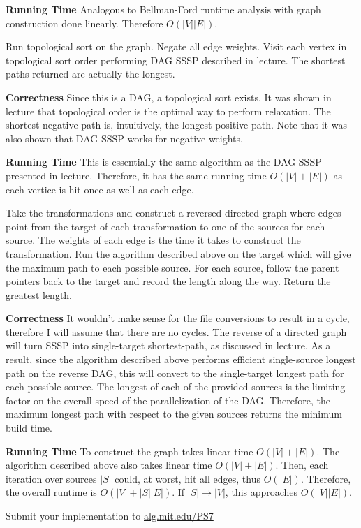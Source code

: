 \documentclass[12pt,twoside]{article}
\begin{document}
\begin{problems}
{\bf Running Time} Analogous to Bellman-Ford runtime analysis with graph
construction done linearly. Therefore $O(|V||E|)$.

\newpage

\problem

\begin{problemparts}

 Run topological sort on the graph. Negate all
edge weights. Visit each vertex in topological sort order performing DAG SSSP
described in lecture. The shortest paths returned are actually the longest.

{\bf Correctness} Since this is a DAG, a topological sort exists. It was
shown in lecture that topological order is the optimal way to perform
relaxation. The shortest negative path is, intuitively, the longest positive
path. Note that it was also shown that DAG SSSP works for negative weights.

{\bf Running Time} This is essentially the same algorithm as the DAG SSSP
presented in lecture. Therefore, it has the same running time $O(|V| + |E|)$
as each vertice is hit once as well as each edge.

 Take the transformations and construct a
reversed directed graph where edges point from the target of each
transformation to one of the sources for each source. The weights of each
edge is the time it takes to construct the transformation. Run the algorithm
described above on the target which will give the maximum path to each
possible source. For each source, follow the parent pointers back to the
target and record the length along the way. Return the greatest length.

{\bf Correctness} It wouldn't make sense for the file conversions to result
in a cycle, therefore I will assume that there are no cycles. The reverse of a
directed graph will turn SSSP into single-target shortest-path, as discussed
in lecture. As a result, since the algorithm described above performs
efficient single-source longest path on the reverse DAG, this will convert to
the single-target longest path for each possible source. The longest of each
of the provided sources is the limiting factor on the overall speed of the
parallelization of the DAG. Therefore, the maximum longest path with respect
to the given sources returns the minimum build time.

{\bf Running Time} To construct the graph takes linear time $O(|V| + |E|)$.
The algorithm described above also takes linear time $O(|V| + |E|)$. Then,
each iteration over sources $|S|$ could, at worst, hit all edges, thus
$O(|E|)$. Therefore, the overall runtime is $O(|V| + |S||E|)$. If $|S|
\longrightarrow |V|$, this approaches $O(|V||E|)$.

\problempart Submit your implementation to {\small\url{alg.mit.edu/PS7}}

\end{problemparts}

\end{problems}
\end{document}

